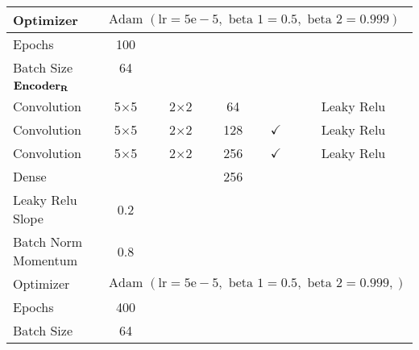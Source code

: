 \begin{longtable}[c]{@{}lccccc@{}}
	Optimizer & \multicolumn{5}{l}{$\text { Adam }(\mathrm{lr}=5 \mathrm{e}-5, \text { beta } 1=0.5, \text { beta } 2=0.999)$} \\ \hline
	Epochs & 100 & \multicolumn{1}{l}{} & \multicolumn{1}{l}{} & \multicolumn{1}{l}{} & \multicolumn{1}{l}{} \\
	Batch Size & 64 & \multicolumn{1}{l}{} & \multicolumn{1}{l}{} & \multicolumn{1}{l}{} & \multicolumn{1}{l}{} \\ \hline
	\multicolumn{6}{l}{$\bold{Encoder_{R}}$} \\
	Convolution & \multicolumn{1}{c}{5$\times$5} & 2$\times$2 & 64 &  & Leaky Relu \\
	Convolution & \multicolumn{1}{c}{5$\times$5} & 2$\times$2 & 128 & $\checkmark$ & Leaky Relu \\
	Convolution & \multicolumn{1}{c}{5$\times$5} & 2$\times$2 & 256 & $\checkmark$ & Leaky Relu \\
	Dense & \multicolumn{1}{c}{} &  & 256 &  &  \\ \hline
	Leaky Relu Slope & 0.2 & \multicolumn{1}{l}{} & \multicolumn{1}{l}{} & \multicolumn{1}{l}{} & \multicolumn{1}{l}{} \\
	Batch Norm Momentum & 0.8 & \multicolumn{1}{l}{} & \multicolumn{1}{l}{} & \multicolumn{1}{l}{} & \multicolumn{1}{l}{} \\
	Optimizer & \multicolumn{5}{l}{$\text { Adam }(\mathrm{lr}=5 \mathrm{e}-5, \text { beta } 1=0.5, \text { beta } 2=0.999,)$} \\ \hline
	Epochs & 400 & \multicolumn{1}{l}{} & \multicolumn{1}{l}{} & \multicolumn{1}{l}{} & \multicolumn{1}{l}{} \\
	Batch Size & 64 & \multicolumn{1}{l}{} & \multicolumn{1}{l}{} & \multicolumn{1}{l}{} & \multicolumn{1}{l}{} \\ \hline
\end{longtable}

\endgroup